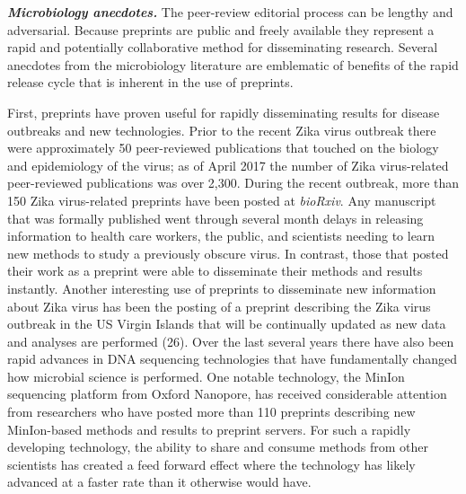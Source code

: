 \documentclass[11pt,]{article}
\begin{document}
\textbf{\emph{Microbiology anecdotes.}} The peer-review editorial
process can be lengthy and adversarial. Because preprints are public and
freely available they represent a rapid and potentially collaborative
method for disseminating research. Several anecdotes from the
microbiology literature are emblematic of benefits of the rapid release
cycle that is inherent in the use of preprints.

First, preprints have proven useful for rapidly disseminating results
for disease outbreaks and new technologies. Prior to the recent Zika
virus outbreak there were approximately 50 peer-reviewed publications
that touched on the biology and epidemiology of the virus; as of April
2017 the number of Zika virus-related peer-reviewed publications was
over 2,300. During the recent outbreak, more than 150 Zika virus-related
preprints have been posted at \emph{bioRxiv}. Any manuscript that was
formally published went through several month delays in releasing
information to health care workers, the public, and scientists needing
to learn new methods to study a previously obscure virus. In contrast,
those that posted their work as a preprint were able to disseminate
their methods and results instantly. Another interesting use of
preprints to disseminate new information about Zika virus has been the
posting of a preprint describing the Zika virus outbreak in the US
Virgin Islands that will be continually updated as new data and analyses
are performed (26). Over the last several years there have also been
rapid advances in DNA sequencing technologies that have fundamentally
changed how microbial science is performed. One notable technology, the
MinIon sequencing platform from Oxford Nanopore, has received
considerable attention from researchers who have posted more than 110
preprints describing new MinIon-based methods and results to preprint
servers. For such a rapidly developing technology, the ability to share
and consume methods from other scientists has created a feed forward
effect where the technology has likely advanced at a faster rate than it
otherwise would have.
\end{document}
